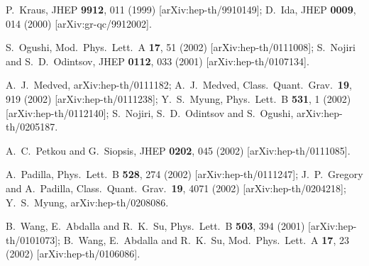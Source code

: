 \documentclass[a4paper,12pt]{article}
\begin{document}
\begin{thebibliography}{99}
P.~Kraus,
JHEP {\bf 9912}, 011 (1999)
[arXiv:hep-th/9910149];
D.~Ida,
JHEP {\bf 0009}, 014 (2000)
[arXiv:gr-qc/9912002].


S.~Ogushi,
Mod.\ Phys.\ Lett.\ A {\bf 17}, 51 (2002) [arXiv:hep-th/0111008];
S.~Nojiri and S.~D.~Odintsov,
JHEP {\bf 0112}, 033 (2001)
[arXiv:hep-th/0107134].


A.~J.~Medved,
arXiv:hep-th/0111182;
A.~J.~Medved,
Class.\ Quant.\ Grav.\  {\bf 19}, 919 (2002)
[arXiv:hep-th/0111238];
Y.~S.~Myung,
Phys.\ Lett.\ B {\bf 531}, 1 (2002) [arXiv:hep-th/0112140];
S.~Nojiri, S.~D.~Odintsov and S.~Ogushi,
arXiv:hep-th/0205187.

A.~C.~Petkou and G.~Siopsis,
JHEP {\bf 0202}, 045 (2002) [arXiv:hep-th/0111085].

A.~Padilla,
Phys.\ Lett.\ B {\bf 528}, 274 (2002) [arXiv:hep-th/0111247];
J.~P.~Gregory and A.~Padilla,
Class.\ Quant.\ Grav.\  {\bf 19}, 4071 (2002)
[arXiv:hep-th/0204218];
Y.~S.~Myung,
arXiv:hep-th/0208086.


B.~Wang, E.~Abdalla and R.~K.~Su,
Phys.\ Lett.\ B {\bf 503}, 394 (2001)
[arXiv:hep-th/0101073];
B.~Wang, E.~Abdalla and R.~K.~Su,
Mod.\ Phys.\ Lett.\ A {\bf 17}, 23 (2002)
[arXiv:hep-th/0106086].


\end{thebibliography}
\end{document}
